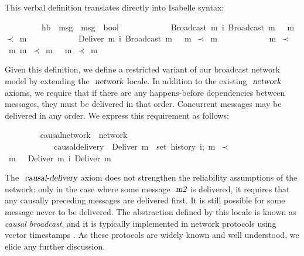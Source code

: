 This verbal definition translates directly into Isabelle syntax:
\vspace{0.35em}
\begin{isabellebody}
\ \ \ \ \ \ \ \ \ hb\ {\isacharcolon}{\isacharcolon}\ {\isachardoublequoteopen}{\isacharprime}msg\ {\isasymRightarrow}\ {\isacharprime}msg\ {\isasymRightarrow}\ bool{\isachardoublequoteclose}\ \isanewline
\ \ \ \ \ \ \ \ \ \ {\isachardoublequoteopen}{\isasymlbrakk}\ Broadcast\ m{}\ {\isasymsqsubset}\isactrlsup i\ Broadcast\ m{}\ {\isasymrbrakk}\ {\isasymLongrightarrow}\ m{}\ $\prec$\ m{}{\isachardoublequoteclose}\ {\isacharbar}\isanewline
\ \ \ \ \ \ \ \ \ \ {\isachardoublequoteopen}{\isasymlbrakk}\ Deliver\ m{}\ {\isasymsqsubset}\isactrlsup i\ Broadcast\ m{}\ {\isasymrbrakk}\ {\isasymLongrightarrow}\ m{}\ $\prec$\ m{}{\isachardoublequoteclose}\ {\isacharbar}\isanewline
\ \ \ \ \ \ \ \ \ \ {\isachardoublequoteopen}{\isasymlbrakk}\ m{}\ $\prec$\  m{}{\isacharsemicolon}\ m{}\ $\prec$\ m{}\ {\isasymrbrakk}\ {\isasymLongrightarrow}\ m{}\ $\prec$\ m{}{\isachardoublequoteclose}
\end{isabellebody}
\vspace{0.35em}
Given this definition, we define a restricted variant of our broadcast network model by extending the $\isa{network}$ locale.
In addition to the existing $\isa{network}$ axioms, we require that if there are any happens-before dependencies between messages, they must be delivered in that order.
Concurrent messages may be delivered in any order.
We express this requirement as follows:
\vspace{0.35em}
\begin{isabellebody}
\ \ \ \ \ \ \ \  causal{\isacharunderscore}network\ {\isacharequal}\ network\ {\isacharplus}\isanewline
\ \ \ \ \ \ \ \ \ \ \ \ causal{\isacharunderscore}delivery{\isacharcolon}\ {\isasymlbrakk}\ {\isachardoublequoteopen}Deliver\ m{}\ {\isasymin}\ set\ {\isacharparenleft}history\ i{\isacharparenright};\ m{}\ $\prec$\ m{}\ {\isasymrbrakk}\ {\isasymLongrightarrow}\ Deliver\ m{}\ {\isasymsqsubset}\isactrlsup i\ Deliver\ m{}{\isachardoublequoteclose}
\end{isabellebody}
\vspace{0.35em}
The $\isa{causal-delivery}$ axiom does not strengthen the reliability assumptions of the network: only in the case where some message $\isa{m2}$ is delivered, it requires that any causally preceding messages are delivered first.
It is still possible for some message never to be delivered.
The abstraction defined by this locale is known as \emph{causal broadcast}, and it is typically implemented in network protocols using vector timestamps \cite{Schwarz:1994gl,Fidge:1988tv,Raynal:1996jl}.
As these protocols are widely known and well understood, we elide any further discussion.


